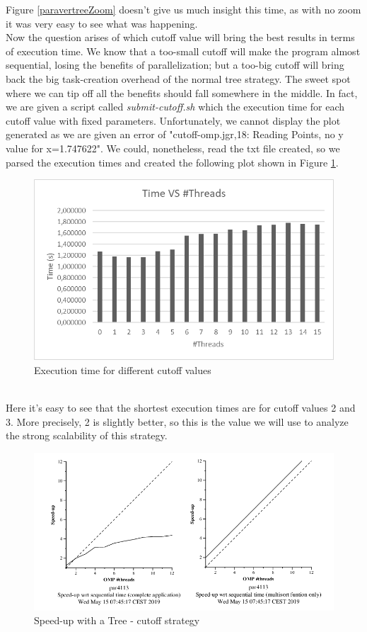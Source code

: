 \documentclass[12]{article}
\begin{document}
Figure \ref{paravertreeZoom} doesn't give us much insight this time, as with no zoom it was very easy to see what was happening.
\\
Now the question arises of which cutoff value will bring the best results in terms of execution time. We know that a too-small cutoff will make the program almost sequential, losing the benefits of parallelization; but a too-big cutoff will bring back the big task-creation overhead of the normal tree strategy. The sweet spot where we can tip off all the benefits should fall somewhere in the middle. In fact, we are given a script called \textit{submit-cutoff.sh} which the execution time for each cutoff value with fixed parameters. Unfortunately, we cannot display the plot generated as we are given an error of "cutoff-omp.jgr,18: Reading Points, no y value for x=1.747622". We could, nonetheless, read the txt file created, so we parsed the execution times and created the following plot shown in Figure \ref{cutoffvalue}.
\medskip
\begin{figure}[H]
    \centering
    \includegraphics[scale=0.6]{images/bestCutoff.png}
    \caption{Execution time for different cutoff values}
    \label{cutoffvalue}
\end{figure}
\\
Here it's easy to see that the shortest execution times are for cutoff values 2 and 3. More precisely, 2 is slightly better, so this is the value we will use to analyze the strong scalability of this strategy.
\\
\medskip
\begin{figure}[H]
    \centering
    \includegraphics[scale=0.75]{images/cutoffStrong.png}
    \caption{Speed-up with a Tree - cutoff strategy}
    \label{speedupcutoff}
\end{figure}
\end{document}

